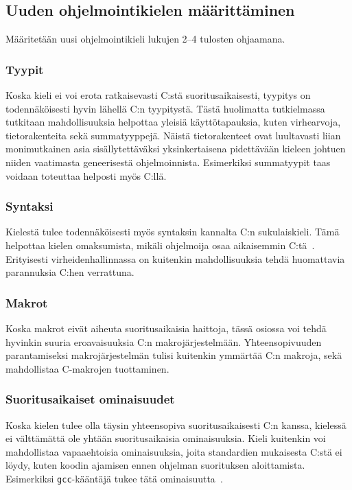 \subsection{Uuden ohjelmointikielen määrittäminen}

Määritetään uusi ohjelmointikieli lukujen 2--4 tulosten ohjaamana.

\subsubsection{Tyypit}

Koska kieli ei voi erota ratkaisevasti C:stä suoritusaikaisesti, tyypitys on
todennäköisesti hyvin lähellä C:n tyypitystä. Tästä huolimatta tutkielmassa
tutkitaan mahdollisuuksia helpottaa yleisiä käyttötapauksia, kuten virhearvoja,
tietorakenteita sekä summatyyppejä. Näistä tietorakenteet ovat luultavasti
liian monimutkainen asia sisällytettäväksi yksinkertaisena pidettävään kieleen
johtuen niiden vaatimasta geneerisestä ohjelmoinnista. Esimerkiksi summatyypit
taas voidaan toteuttaa helposti myös C:llä.

\subsubsection{Syntaksi}

Kielestä  tulee todennäköisesti myös syntaksin kannalta C:n sukulaiskieli. Tämä
helpottaa kielen omaksumista, mikäli ohjelmoija osaa aikaisemmin
C:tä~\citep{languagelearning}. Erityisesti virheidenhallinnassa on kuitenkin
mahdollisuuksia tehdä huomattavia parannuksia C:hen verrattuna.

\subsubsection{Makrot}

Koska makrot eivät aiheuta suoritusaikaisia haittoja, tässä osiossa voi tehdä
hyvinkin suuria eroavaisuuksia C:n makrojärjestelmään. Yhteensopivuuden
parantamiseksi makrojärjestelmän tulisi kuitenkin ymmärtää C:n makroja, sekä
mahdollistaa C-makrojen tuottaminen.

\subsubsection{Suoritusaikaiset ominaisuudet}

Koska kielen tulee olla täysin yhteensopiva suoritusaikaisesti C:n kanssa,
kielessä ei välttämättä ole yhtään suoritusaikaisia ominaisuuksia. Kieli
kuitenkin voi mahdollistaa vapaaehtoisia ominaisuuksia, joita standardien
mukaisesta C:stä ei löydy, kuten koodin ajamisen ennen ohjelman suorituksen
aloittamista. Esimerkiksi \texttt{gcc}-kääntäjä tukee tätä
ominaisuutta~\citep{gccattributes}.


